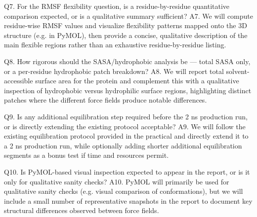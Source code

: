 Q7. For the RMSF flexibility question, is a residue-by-residue quantitative comparison expected, or is a qualitative summary sufficient?
A7. We will compute residue-wise RMSF values and visualize flexibility patterns mapped onto the 3D structure (e.g. in PyMOL), then provide a concise, qualitative description of the main flexible regions rather than an exhaustive residue-by-residue listing.

Q8. How rigorous should the SASA/hydrophobic analysis be — total SASA only, or a per-residue hydrophobic patch breakdown?
A8. We will report total solvent-accessible surface area for the protein and complement this with a qualitative inspection of hydrophobic versus hydrophilic surface regions, highlighting distinct patches where the different force fields produce notable differences.

Q9. Is any additional equilibration step required before the 2 ns production run, or is directly extending the existing protocol acceptable?
A9. We will follow the existing equilibration protocol provided in the practical and directly extend it to a 2 ns production run, while optionally adding shorter additional equilibration segments as a bonus test if time and resources permit.

Q10. Is PyMOL-based visual inspection expected to appear in the report, or is it only for qualitative sanity checks?
A10. PyMOL will primarily be used for qualitative sanity checks (e.g. visual comparison of conformations), but we will include a small number of representative snapshots in the report to document key structural differences observed between force fields.
